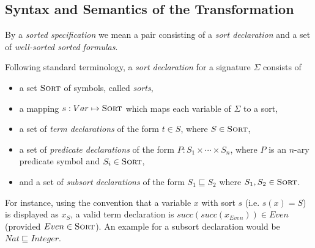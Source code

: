 \documentclass[fleqn]{scrartcl}
\newcommand{\sort}{\textsc{Sort}\xspace}
\begin{document}
\subsection{Syntax and Semantics of the Transformation}
\label{sec:ProspecSemantics}
By  a {\em sorted
  specification\/} we mean a pair consisting of a {\em sort declaration\/}
  and a set of {\em well-sorted sorted formulas\/}.

Following standard terminology, a {\em sort declaration\/} for a signature
$\Sigma$ consists of 
\begin{itemize}
\item a set $\sort$ of symbols, called {\em sorts\/}, 
\item a mapping $s:Var \mapsto \sort$ which maps each variable of
  $\Sigma$ to a sort, 
\item a set of {\em term declarations\/} of the form $t \in S$, where $S \in
\sort$, 
\item a set of {\em predicate declarations\/} of the form
$P : S_1 \times \cdots \times S_n$, where $P$ is an
$n$-ary predicate symbol and $S_i \in \sort$,
\item and a set of {\em subsort declarations\/} of the form $S_1
  \sqsubseteq S_2$ where $S_1,S_2 \in \sort$.
\end{itemize}
For instance, using the convention that a variable $x$ with sort
$s$ (i.e. $s(x) = S$) is displayed as $x_S$, a valid term
declaration is $succ(succ(x_{Even})) \in Even$ (provided $Even \in
\sort$). An example for a subsort declaration would be $Nat
\sqsubseteq Integer$.
\end{document}
